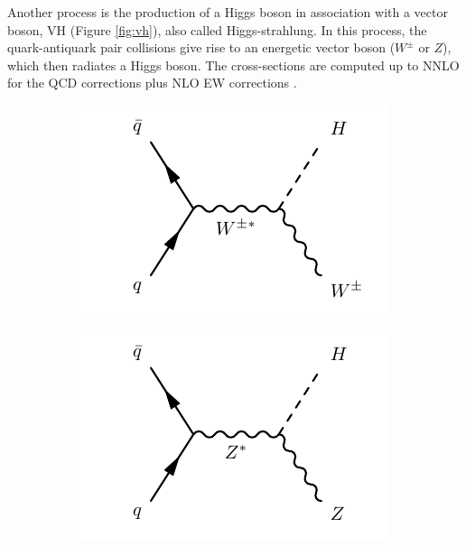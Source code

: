 Another process is the production of a Higgs boson in association with a vector boson, VH (Figure \ref{fig:vh}), also called Higgs-strahlung. In this process, the quark-antiquark pair collisions give rise to an energetic vector boson ($W^{\pm}$ or $Z$), which then radiates a Higgs boson. The cross-sections are computed up to NNLO for the QCD corrections plus NLO EW corrections \cite{deFlorian:2227475}.


\begin{figure}
\centering
\begin{subfigure}[b]{0.3\textwidth}
  \centering
  \includegraphics[width=\textwidth]{Images/VH1.pdf}
  \caption{\label{fig:vh1}}
\end{subfigure}%
\begin{subfigure}[b]{0.3\textwidth}
  \centering
  \includegraphics[width=\textwidth]{Images/VH2.pdf}
  \caption{\label{fig:vh2}}

\end{subfigure}
\end{figure}
